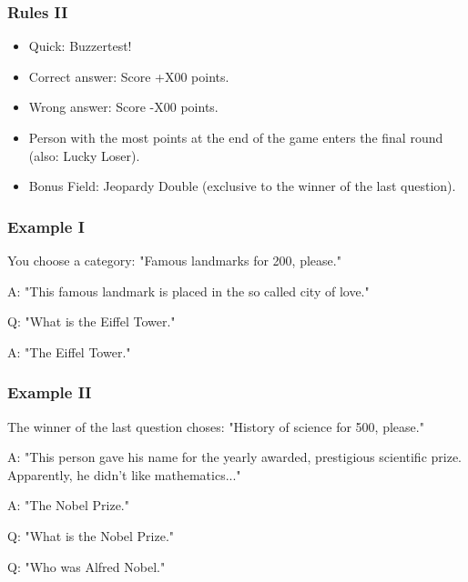 \documentclass{beamer}
\begin{document}
		\begin{frame}
			\frametitle{Rules II}
			\begin{itemize}
			\item Quick: Buzzertest!
			\item Correct answer: Score +X00 points. 
			\item Wrong answer: Score -X00 points.
			\item Person with the most points at the end of the game enters the final round (also: Lucky Loser).
			\item Bonus Field: Jeopardy Double (exclusive to the winner of the last question).
		\end{itemize}
	\end{frame}
		

	
	\begin{frame}
		\frametitle{Example I }
		You choose a category: "Famous landmarks for 200, please."
		\vspace{1cm}
		\pause
		
		A: "This famous landmark is placed in the so called city of love."
		
		\vspace{1cm}
		
		\pause 
		Q: "What is the Eiffel Tower." {\color{green}{Right! +200}}
		
		\pause
		A: "The Eiffel Tower."  {\color{red}{Wrong! -200}}
		
		
		
		
		
	\end{frame}	
	
		\begin{frame}
			\frametitle{Example II }
			The winner of the last question choses: "History of science for 500, please."
			\vspace{1cm}
			\pause
			
			A: "This person gave his name for the yearly awarded, prestigious scientific prize. Apparently, he didn't like mathematics..."
			
			\vspace{1cm}
			
			\pause
			A: "The Nobel Prize." \pause {\color{red}{Wrong! -500}}
			
			\pause
			Q: "What is the Nobel Prize." \pause {\color{red}{Wrong! -500}}
						
			\pause
			Q: "Who was Alfred Nobel." {\color{green}{Right! +500}}
			
			
			
		\end{frame}	
	
\end{document}
